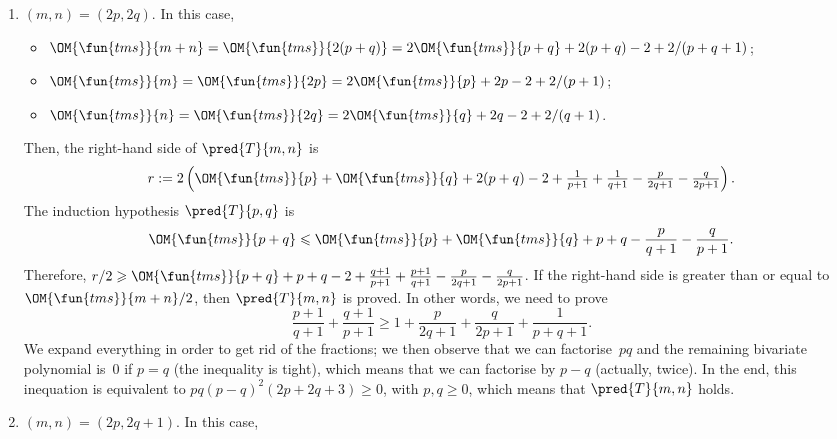 \begin{enumerate}

  \item \((m,n) = (2p,2q)\). In this case,
    \begin{itemize}

      \item \(\OM{\fun{tms}}{m+n} = \OM{\fun{tms}}{2(p+q)} =
        2\OM{\fun{tms}}{p+q} + 2(p+q) - 2 + 2/(p+q+1)\);

      \item \(\OM{\fun{tms}}{m} = \OM{\fun{tms}}{2p} =
        2\OM{\fun{tms}}{p} + 2p - 2 + 2/(p+1)\);

      \item \(\OM{\fun{tms}}{n} = \OM{\fun{tms}}{2q} =
        2\OM{\fun{tms}}{q} + 2q - 2 + 2/(q+1)\).

    \end{itemize}
    Then, the right\hyp{}hand side of \(\pred{T}{m,n}\) is
    \begin{equation*}
      r := 2\left(\OM{\fun{tms}}{p} + \OM{\fun{tms}}{q} + 2(p+q) - 2 +
        \tfrac{1}{p+1} + \tfrac{1}{q+1} - \tfrac{p}{2q+1} -
        \tfrac{q}{2p+1}\right).
    \end{equation*}
    The induction hypothesis \(\pred{T}{p,q}\) is
    \begin{equation*}
      \OM{\fun{tms}}{p+q} \leqslant \OM{\fun{tms}}{p} +
      \OM{\fun{tms}}{q} + p + q - \frac{p}{q+1} - \frac{q}{p+1}.
    \end{equation*}
    Therefore, \(r/2 \geqslant \OM{\fun{tms}}{p+q} + p + q -
    2 + \tfrac{q+1}{p+1} + \tfrac{p+1}{q+1} - \tfrac{p}{2q+1} -
    \tfrac{q}{2p+1}\). If the right\hyp{}hand side is greater than or
    equal to \(\OM{\fun{tms}}{m+n}/2\), then
    \(\pred{T}{m,n}\) is proved. In other words, we need to prove
    \begin{equation*}
      \frac{p+1}{q+1} + \frac{q+1}{p+1} \geqslant 1 +
      \frac{p}{2q+1} + \frac{q}{2p+1} + \frac{1}{p+q+1}.
    \end{equation*}
    We expand everything in order to get rid of the fractions; we then
    observe that we can factorise~\(pq\) and the remaining bivariate
    polynomial is~\(0\) if \(p=q\) (the inequality is tight), which
    means that we can factorise by \(p-q\) (actually, twice). In the
    end, this inequation is equivalent to \(pq(p-q)^2(2p+2q+3)
    \geqslant 0\), with \(p,q \geqslant 0\), which means that
    \(\pred{T}{m,n}\) holds.

  \item \((m,n) = (2p,2q+1)\). In this case,
    \begin{itemize}


\end{itemize}
\end{enumerate}
